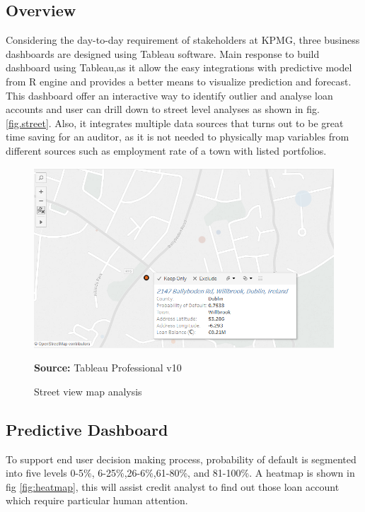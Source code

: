 \subsection{Overview}

Considering the day-to-day requirement of stakeholders at KPMG, three business dashboards are designed using Tableau software. Main response to build dashboard using Tableau,as it allow the easy integrations with predictive model from R engine and provides a better means to visualize prediction and forecast. This dashboard offer an interactive way to identify outlier and analyse loan accounts and user can drill down to street level analyses as shown in fig.\ref{fig.street}. Also, it integrates multiple data sources that turns out to be great time saving for an auditor, as it is not needed to physically map variables from different sources such as employment rate of a town with listed portfolios.\\

\begin{center}
\begin{figure}[!htb]
\includegraphics[width=\textwidth]{street.png}
\centering
\caption{Street view map analysis}{\textbf{Source:} Tableau Professional v10}
\label{fig:street}
\end{figure}
\end{center}

\subsection{Predictive Dashboard}

To support end user decision making process, probability of default is segmented into five levels 0-5\%, 6-25\%,26-6\%,61-80\%, and 81-100\%. A heatmap is shown in fig \ref{fig:heatmap}, this will assist credit analyst to find out those loan account which require particular human attention.

